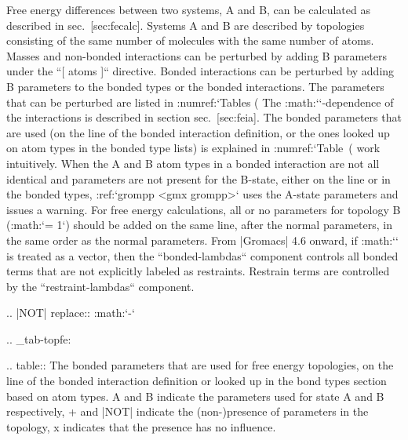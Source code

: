 Free energy differences between two systems, A and B, can be calculated
as described in sec. [sec:fecalc]. Systems A and B are described by
topologies consisting of the same number of molecules with the same
number of atoms. Masses and non-bonded interactions can be perturbed by
adding B parameters under the ``[ atoms ]`` directive. Bonded interactions can be
perturbed by adding B parameters to the bonded types or the bonded
interactions. The parameters that can be perturbed are listed in
:numref:`Tables (%
The :math:`\lambda`-dependence of the
interactions is described in section sec. [sec:feia]. The bonded
parameters that are used (on the line of the bonded interaction
definition, or the ones looked up on atom types in the bonded type
lists) is explained in :numref:`Table (%
work intuitively. When the A and B atom types in a bonded interaction
are not all identical and parameters are not present for the B-state,
either on the line or in the bonded types, :ref:`grompp <gmx grompp>` uses the A-state
parameters and issues a warning. For free energy calculations, all or no
parameters for topology B (:math:`\lambda = 1`) should be added on the
same line, after the normal parameters, in the same order as the normal
parameters. From |Gromacs| 4.6 onward, if :math:`\lambda` is treated as a
vector, then the ``bonded-lambdas`` component controls all bonded terms that
are not explicitly labeled as restraints. Restrain terms are controlled
by the ``restraint-lambdas`` component.

.. |NOT| replace:: :math:`-`

.. _tab-topfe:

.. table:: The bonded parameters that are used for free energy topologies,
           on the line of the bonded interaction definition or looked up
           in the bond types section based on atom types. A and B indicate the
           parameters used for state A and B respectively, + and |NOT| indicate
           the (non-)presence of parameters in the topology, x indicates that
           the presence has no influence.

